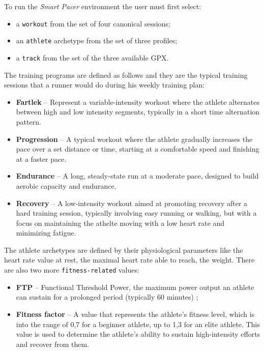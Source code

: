 
To run the \emph{Smart Pacer} environment the user must first select:
\begin{itemize}
  \item a \texttt{workout} from the set of four canonical sessions;
  \item an \texttt{athlete} archetype from the set of three profiles;
  \item a \texttt{track} from the set of the three available GPX.
\end{itemize}

The training programs are defined as follows and they are the typical training sessions that a runner would do during his weekly training plan:
\begin{itemize}
  \item \textbf{Fartlek} – Represent a variable-intensity workout where the athlete alternates between high and low intensity segments, typically in a short time alternation pattern.
  \item \textbf{Progression} – A typical workout where the athlete gradually increases the pace over a set distance or time, starting at a comfortable speed and finishing at a faster pace.
  \item \textbf{Endurance} – A long, steady-state run at a moderate pace, designed to build aerobic capacity and endurance.
  \item \textbf{Recovery} – A low-intensity workout aimed at promoting recovery after a hard training session, typically involving easy running or walking, but with a focus on maintaining the athelte moving with a low heart rate and minimizing fatigue.
\end{itemize}

The athlete archetypes are defined by their physiological parameters like the heart rate value at rest, the maximal heart rate able to reach, the weight. There are also two more \texttt{fitness-related} values: 
\begin{itemize}
\item \textbf{FTP} – Functional Threshold Power, the maximum power output an athlete can sustain for a prolonged period (typically 60 minutes) ;
\item \textbf{Fitness factor} – A value that represents the athlete's fitness level, which is into the range of 0,7 for a beginner athlete, up to 1,3 for an elite athlete. This value is used to determine the athlete's ability to sustain high-intensity efforts and recover from them.
\end{itemize}

